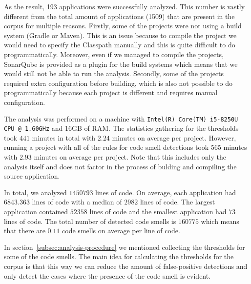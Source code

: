 

As the result, 193 applications were successfully analyzed.
This number is vastly different from the total amount of applications (1509) that are present in the corpus for multiple reasons.
Firstly, some of the projects were not using a build system (Gradle or Maven).
This is an issue because to compile the project we would need to specify the Classpath manually and
this is quite difficult to do programmatically.
Moreover, even if we managed to compile the projects, SonarQube is provided as a plugin for the build systems which means
that we would still not be able to run the analysis.
Secondly, some of the projects required extra configuration before building, which is also not possible to do
programmatically because each project is different and requires manual configuration.

The analysis was performed on a machine with \verb|Intel(R) Core(TM) i5-8250U CPU|\verb| @ 1.60GHz| and 16GB of RAM\@.
The statistics gathering for the thresholds took $441$ minutes in total with $2.24$ minutes on average per project.
However, running a project with all of the rules for code smell detections took $565$ minutes with $2.93$ minutes on average per project.
Note that this includes only the analysis itself and does not factor in the process of bulding and compiling the source
application.

In total, we analyzed $1450793$ lines of code.
On average, each application had $6843.363$ lines of code with a median of $2982$ lines of code.
The largest application contained $52358$ lines of code and the smallest application had $73$ lines of code.
The total number of detected code smells is $160775$ which means that there are $0.11$ code smells on average per line of code.


In section~\ref{subsec:analysis-procedure} we mentioned collecting the thresholds for some of the code smells.
The main idea for calculating the thresholds for the corpus is that this way we can reduce
the amount of false-positive detections and only detect the cases where the presence of the code smell is evident.

